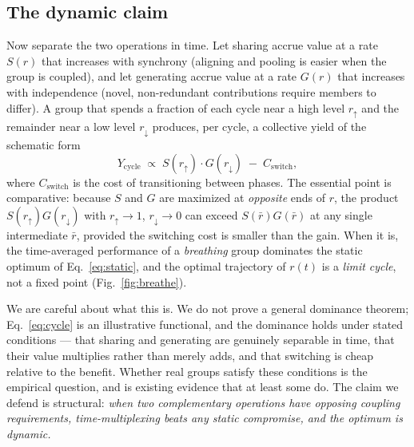 \documentclass[11pt]{article}
\begin{document}
\subsection{The dynamic claim}

Now separate the two operations in time. Let sharing accrue value at a rate $S(r)$ that increases with synchrony (aligning and pooling is easier when the group is coupled), and let generating accrue value at a rate $G(r)$ that increases with independence (novel, non-redundant contributions require members to differ). A group that spends a fraction of each cycle near a high level $r_{\uparrow}$ and the remainder near a low level $r_{\downarrow}$ produces, per cycle, a collective yield of the schematic form
\begin{equation}
Y_{\text{cycle}} \;\propto\; S(r_{\uparrow})\cdot G(r_{\downarrow}) \;-\; C_{\text{switch}},
\label{eq:cycle}
\end{equation}
where $C_{\text{switch}}$ is the cost of transitioning between phases. The essential point is comparative: because $S$ and $G$ are maximized at \emph{opposite} ends of $r$, the product $S(r_{\uparrow})G(r_{\downarrow})$ with $r_{\uparrow}\to 1$, $r_{\downarrow}\to 0$ can exceed $S(\bar r)G(\bar r)$ at any single intermediate $\bar r$, provided the switching cost is smaller than the gain. When it is, the time-averaged performance of a \emph{breathing} group dominates the static optimum of Eq.~\eqref{eq:static}, and the optimal trajectory of $r(t)$ is a \emph{limit cycle}, not a fixed point (Fig.~\ref{fig:breathe}).

We are careful about what this is. We do not prove a general dominance theorem; Eq.~\eqref{eq:cycle} is an illustrative functional, and the dominance holds under stated conditions --- that sharing and generating are genuinely separable in time, that their value multiplies rather than merely adds, and that switching is cheap relative to the benefit. Whether real groups satisfy these conditions is the empirical question, and \citet{bernstein2018intermittent} is existing evidence that at least some do. The claim we defend is structural: \emph{when two complementary operations have opposing coupling requirements, time-multiplexing beats any static compromise, and the optimum is dynamic.}
\end{document}
